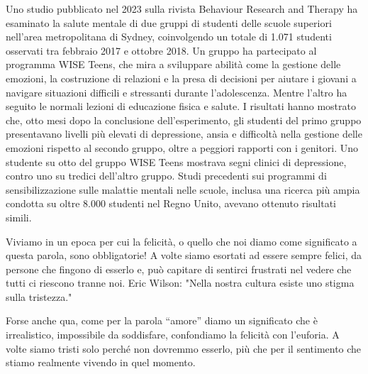 \documentclass[12pt]{book} %
\begin{document}
Uno studio pubblicato nel 2023 sulla rivista Behaviour Research and Therapy ha esaminato la salute mentale di due gruppi di studenti delle scuole superiori nell’area metropolitana di Sydney, coinvolgendo un totale di 1.071 studenti osservati tra febbraio 2017 e ottobre 2018. Un gruppo ha partecipato al programma WISE Teens, che mira a sviluppare abilità come la gestione delle emozioni, la costruzione di relazioni e la presa di decisioni per aiutare i giovani a navigare situazioni difficili e stressanti durante l’adolescenza. Mentre l’altro ha seguito le normali lezioni di educazione fisica e salute. I risultati hanno mostrato che, otto mesi dopo la conclusione dell’esperimento, gli studenti del primo gruppo presentavano livelli più elevati di depressione, ansia e difficoltà nella gestione delle emozioni rispetto al secondo gruppo, oltre a peggiori rapporti con i genitori. Uno studente su otto del gruppo WISE Teens mostrava segni clinici di depressione, contro uno su tredici dell’altro gruppo.
Studi precedenti sui programmi di sensibilizzazione sulle malattie mentali nelle scuole, inclusa una ricerca più ampia condotta su oltre 8.000 studenti nel Regno Unito, avevano ottenuto risultati simili.

Viviamo in un epoca per cui la felicità, o quello che noi diamo come significato a questa parola, sono obbligatorie!
A volte siamo esortati ad essere sempre felici, da persone che fingono di esserlo e, può capitare di sentirci frustrati nel vedere che
tutti ci riescono tranne noi. Eric Wilson: "Nella
nostra cultura esiste uno stigma sulla tristezza."

Forse anche qua, come per la parola “amore” diamo un significato che è irrealistico, impossibile da soddisfare,
confondiamo la felicità con l'euforia. A volte siamo tristi solo perché non dovremmo esserlo, più
che per il sentimento che stiamo realmente vivendo in quel momento.
\end{document}
